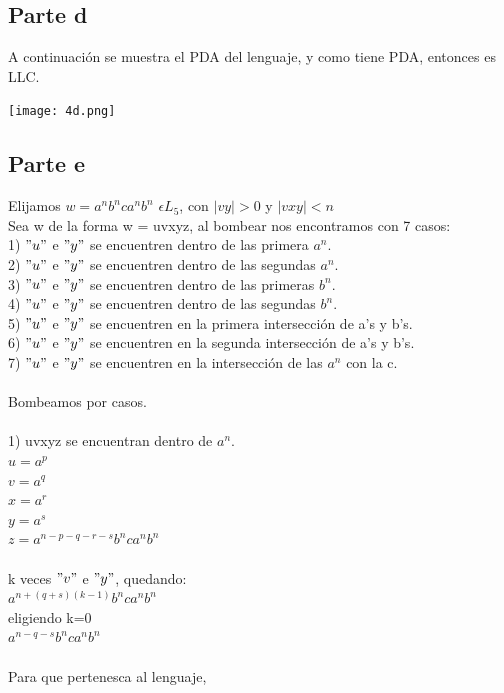 \documentclass[11pt,letterpaper]{article}
\begin{document}
\subsection{Parte d}
	A continuación se muestra el PDA del lenguaje, y como tiene PDA, entonces es LLC.
	\begin{center}
	\texttt{[image: 4d.png]}
	\end{center}


\subsection{Parte e}
Elijamos $w = a^nb^nca^nb^n$ $\epsilon L_{5}$, con $|vy|>0$ y $|vxy|<n$ \\
Sea w de la forma w = uvxyz, al bombear nos encontramos con 7 casos: \\
1) $"u"$ e $"y"$ se encuentren dentro de las primera $a^n$. \\
2) $"u"$ e $"y"$ se encuentren dentro de las segundas $a^n$. \\
3) $"u"$ e $"y"$ se encuentren dentro de las primeras $b^n$. \\
4) $"u"$ e $"y"$ se encuentren dentro de las segundas $b^n$. \\
5) $"u"$ e $"y"$ se encuentren en la primera intersección de a's y b's. \\
6) $"u"$ e $"y"$ se encuentren en la segunda intersección de a's y b's. \\
7) $"u"$ e $"y"$ se encuentren en la intersección de las $a^n$ con la c. \\
 \\
Bombeamos por casos. \\
 \\
1) uvxyz se encuentran dentro de $a^n$. \\
\indent $u=a^p$ \\
\indent $v=a^q$ \\
\indent $x=a^r$ \\
\indent $y=a^s$ \\
\indent $z=a^{n-p-q-r-s}b^nca^nb^n$ \\
 \\
\indent k veces $"v"$ e $"y"$, quedando: \\
\indent $a^{n+(q+s)(k-1)}b^nca^nb^n$ \\
\indent eligiendo k=0 \\
\indent $a^{n-q-s}b^nca^nb^n$ \\
 \\
\indent Para que pertenesca al lenguaje, \\
\end{document}
